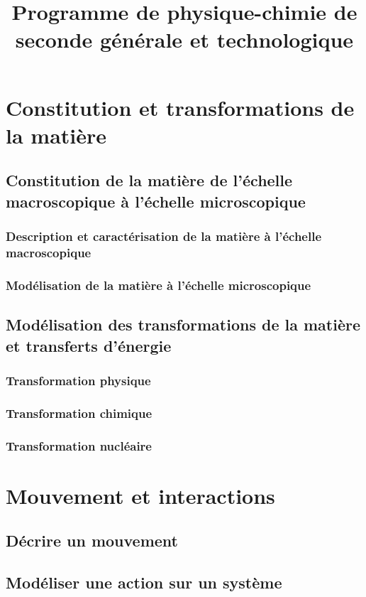 \documentclass[12pt,a4paper]{article}
\title{Programme de physique-chimie de seconde générale et technologique}
\date{}
\begin{document}
\maketitle

\section*{Constitution et transformations de la matière}
  \subsection*{Constitution de la matière de l'échelle macroscopique à l'échelle microscopique}
    \subsubsection*{Description et caractérisation de la matière à l'échelle macroscopique}
    \subsubsection*{Modélisation de la matière à l'échelle microscopique}
  \subsection*{Modélisation des transformations de la matière et transferts d'énergie}
    \subsubsection*{Transformation physique}
    \subsubsection*{Transformation chimique}
    \subsubsection*{Transformation nucléaire}

\section*{Mouvement et interactions}
\subsection*{Décrire un mouvement}
\subsection*{Modéliser une action sur un système}
\end{document}
